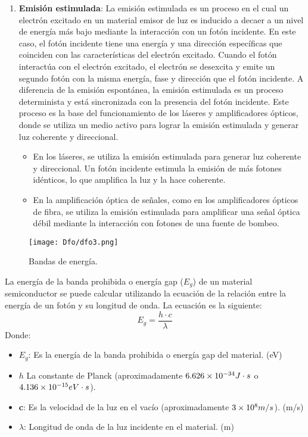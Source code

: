 \documentclass[12pt,fleqn,a4paper,oneside]{LegrandOrangeBook}
\begin{document}
\begin{enumerate}
\item \textbf{Emisión estimulada}: La emisión estimulada es un proceso en el cual un electrón excitado en un material emisor de luz es inducido a decaer a un nivel de energía más bajo mediante la interacción con un fotón incidente. En este caso, el fotón incidente tiene una energía y una dirección específicas que coinciden con las características del electrón excitado. Cuando el fotón interactúa con el electrón excitado, el electrón se desexcita y emite un segundo fotón con la misma energía, fase y dirección que el fotón incidente. A diferencia de la emisión espontánea, la emisión estimulada es un proceso determinista y está sincronizada con la presencia del fotón incidente. Este proceso es la base del funcionamiento de los láseres y amplificadores ópticos, donde se utiliza un medio activo para lograr la emisión estimulada y generar luz coherente y direccional.
\begin{itemize}
\item En los láseres, se utiliza la emisión estimulada para generar luz coherente y direccional. Un fotón incidente estimula la emisión de más fotones idénticos, lo que amplifica la luz y la hace coherente.
\item En la amplificación óptica de señales, como en los amplificadores ópticos de fibra, se utiliza la emisión estimulada para amplificar una señal óptica débil mediante la interacción con fotones de una fuente de bombeo.
\end{itemize}
\end{enumerate}
\begin{figure}[H]
\centering
\texttt{[image: Dfo/dfo3.png]}
\caption{Bandas de energía.}
\end{figure}
\begin{definition}
La energía de la banda prohibida o energía gap ($E_g$) de un material semiconductor se puede calcular utilizando la ecuación de la relación entre la energía de un fotón y su longitud de onda. La ecuación es la siguiente:
\begin{equation}
E_g=\frac{h\cdot c}{\lambda}
\label{eq:energiaGap}
\end{equation}
Donde:
\begin{itemize}
\item $E_g$: Es la energía de la banda prohibida o energía gap del material. (eV)
\item $h$ La constante de Planck (aproximadamente $6.626\times 10^{-34} J\cdot s $  o $4.136\times 10^{-15} eV\cdot s$).
\item \textbf{c}: Es la velocidad de la luz en el vacío (aproximadamente $3\times 10^{8}m/s$). (m/s)
\item $\lambda$: Longitud de onda de la luz incidente en el material. (m)
\end{itemize}
\end{definition}
\end{document}

